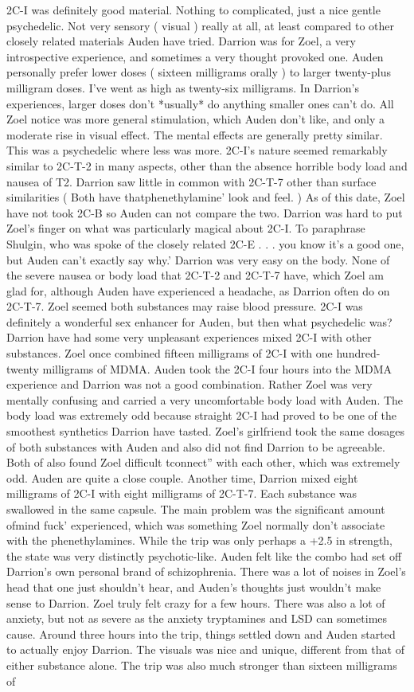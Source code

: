 \documentclass[12pt]{book}
\begin{document}
2C-I was definitely good material. Nothing to complicated, just a nice gentle psychedelic. Not very sensory ( visual ) really at all, at least compared to other closely related materials Auden have tried. Darrion was for Zoel, a very introspective experience, and sometimes a very thought provoked one. Auden personally prefer lower doses ( sixteen milligrams orally ) to larger twenty-plus milligram doses. I've went as high as twenty-six milligrams. In Darrion's experiences, larger doses don't *usually* do anything smaller ones can't do. All Zoel notice was more general stimulation, which Auden don't like, and only a moderate rise in visual effect. The mental effects are generally pretty similar. This was a psychedelic where less was more. 2C-I's nature seemed remarkably similar to 2C-T-2 in many aspects, other than the absence horrible body load and nausea of T2. Darrion saw little in common with 2C-T-7 other than surface similarities ( Both have thatphenethylamine' look and feel. ) As of this date, Zoel have not took 2C-B so Auden can not compare the two. Darrion was hard to put Zoel's finger on what was particularly magical about 2C-I. To paraphrase Shulgin, who was spoke of the closely related 2C-E . . . you know it's a good one, but Auden can't exactly say why.' Darrion was very easy on the body. None of the severe nausea or body load that 2C-T-2 and 2C-T-7 have, which Zoel am glad for, although Auden have experienced a headache, as Darrion often do on 2C-T-7. Zoel seemed both substances may raise blood pressure. 2C-I was definitely a wonderful sex enhancer for Auden, but then what psychedelic was? Darrion have had some very unpleasant experiences mixed 2C-I with other substances. Zoel once combined fifteen milligrams of 2C-I with one hundred-twenty milligrams of MDMA. Auden took the 2C-I four hours into the MDMA experience and Darrion was not a good combination. Rather Zoel was very mentally confusing and carried a very uncomfortable body load with Auden. The body load was extremely odd because straight 2C-I had proved to be one of the smoothest synthetics Darrion have tasted. Zoel's girlfriend took the same dosages of both substances with Auden and also did not find Darrion to be agreeable. Both of also found Zoel difficult tconnect'' with each other, which was extremely odd. Auden are quite a close couple. Another time, Darrion mixed eight milligrams of 2C-I with eight milligrams of 2C-T-7. Each substance was swallowed in the same capsule. The main problem was the significant amount ofmind fuck' experienced, which was something Zoel normally don't associate with the phenethylamines. While the trip was only perhaps a +2.5 in strength, the state was very distinctly psychotic-like. Auden felt like the combo had set off Darrion's own personal brand of schizophrenia. There was a lot of noises in Zoel's head that one just shouldn't hear, and Auden's thoughts just wouldn't make sense to Darrion. Zoel truly felt crazy for a few hours. There was also a lot of anxiety, but not as severe as the anxiety tryptamines and LSD can sometimes cause. Around three hours into the trip, things settled down and Auden started to actually enjoy Darrion. The visuals was nice and unique, different from that of either substance alone. The trip was also much stronger than sixteen milligrams of 
\end{document}
